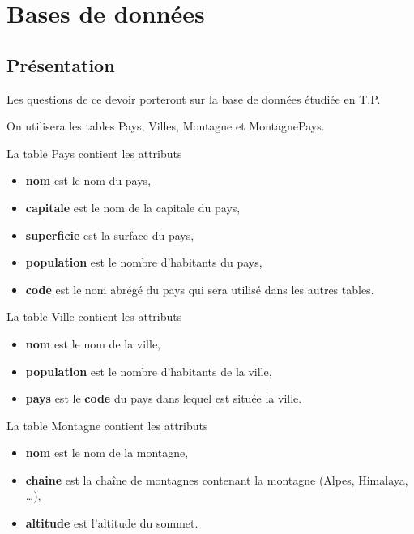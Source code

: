 \chapter{Bases de données}
\section{Présentation} 
Les questions de ce devoir porteront sur la base de données étudiée en T.P.

On utilisera les tables {\sc Pays}, {\sc Villes}, {\sc Montagne} et {\sc MontagnePays}. 

La table {\sc Pays} contient les attributs
\begin{itemize}
    \item {\bf nom} est le nom du pays,
    \item {\bf capitale} est le nom de la capitale du pays,    
    \item {\bf superficie} est la surface du pays,
    \item {\bf population} est le nombre d'habitants du pays,
    \item {\bf code} est le nom abrégé du pays qui sera utilisé dans les autres tables.
\end{itemize}

La table {\sc Ville} contient les attributs
\begin{itemize}
    \item {\bf nom} est le nom de la ville,
    \item {\bf population} est le nombre d'habitants de la ville,
    \item {\bf pays} est le {\bf code} du pays dans lequel est située la ville.
\end{itemize}

La table {\sc Montagne} contient les attributs
\begin{itemize}
    \item {\bf nom} est le nom de la montagne,
    \item {\bf chaine} est la chaîne de montagnes contenant la montagne (Alpes, Himalaya, \dots),
    \item {\bf altitude} est l'altitude du sommet.
\end{itemize}

